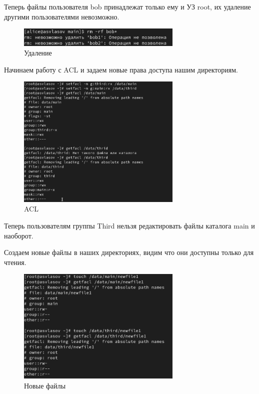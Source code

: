 \documentclass[
  12pt,
  a4paper,
  DIV=11,
  numbers=noendperiod]{scrreprt}
\begin{document}
Теперь файлы пользователя bob принадлежат только ему и УЗ root, их
удаление другими пользователями невозможно.

\begin{figure}

{\centering \includegraphics[width=0.7\textwidth,height=\textheight]{image/7.png}

}

\caption{Удаление}

\end{figure}%

Начинаем работу с ACL и задаем новые права доступа нашим директориям.

\begin{figure}

{\centering \includegraphics[width=0.7\textwidth,height=\textheight]{image/8.png}

}

\caption{ACL}

\end{figure}%

Теперь пользователям группы Third нельзя редактировать файлы каталога
main и наоборот.

Создаем новые файлы в наших директориях, видим что они доступны только
для чтения.

\begin{figure}

{\centering \includegraphics[width=0.7\textwidth,height=\textheight]{image/9.png}

}

\caption{Новые файлы}

\end{figure}%
\end{document}
